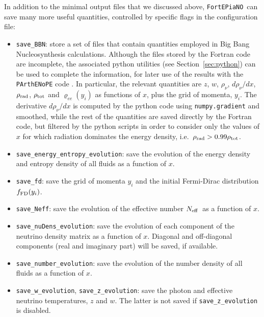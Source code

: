 \documentclass[notitlepage,showpacs,preprintnumbers,amsmath,amssymb,superscriptaddress,prd,onecolumn]{revtex4-1}
\newcommand{\Neff}{\ensuremath{N_{\rm eff}}}
\newcommand{\fortepiano}{\texttt{FortEPiaNO}}
\begin{document}
In addition to the minimal output files that we discussed above,
\fortepiano\ can save many more useful quantities,
controlled by specific flags in the configuration file:
%
\begin{itemize}
%
\item \texttt{save\_BBN}: store a set of files that contain quantities employed
in Big Bang Nucleosynthesis calculations.
Although the files stored by the Fortran code are incomplete,
the associated python utilities (see Section~\ref{sec:python})
can be used to complete the information,
for later use of the results with the \texttt{PArthENoPE} code \cite{Pisanti:2007hk,Consiglio:2017pot,...}.
In particular, the relevant quantities are
$z$, $w$, $\rho_\nu$, $d\rho_\nu/dx$,
$\rho_{\rm rad}$, $\rho_{\rm tot}$
and $\varrho_{ee}(y_i)$
as functions of $x$, plus the grid of momenta, $y_i$.
The derivative $d\rho_\nu/dx$ is computed by the python code
using \texttt{numpy.gradient} and smoothed,
while the rest of the quantities are saved directly by the Fortran code,
but filtered by the python scripts in order to consider only the values of $x$ for which
radiation dominates the energy density, i.e.\ $\rho_{\rm rad}>0.99\rho_{\rm tot}$.
%
\item \texttt{save\_energy\_entropy\_evolution}:
save the evolution of the energy density and entropy density of all fluids as a function of $x$.
%
\item \texttt{save\_fd}: save the grid of momenta $y_i$ and the initial Fermi-Dirac distribution
$f_{\rm FD}(y_i)$.
%
\item \texttt{save\_Neff}: save the evolution of the effective number \Neff\ as a function of $x$.
%
\item \texttt{save\_nuDens\_evolution}:
save the evolution of each component of the neutrino density matrix as a function of $x$.
Diagonal and off-diagonal components (real and imaginary part) will be saved, if available.
%
\item \texttt{save\_number\_evolution}:
save the evolution of the number density of all fluids as a function of $x$.
%
\item \texttt{save\_w\_evolution}, \texttt{save\_z\_evolution}:
save the photon and effective neutrino temperatures, $z$ and $w$.
The latter is not saved if \texttt{save\_z\_evolution} is disabled.
%
\end{itemize}
\end{document}
